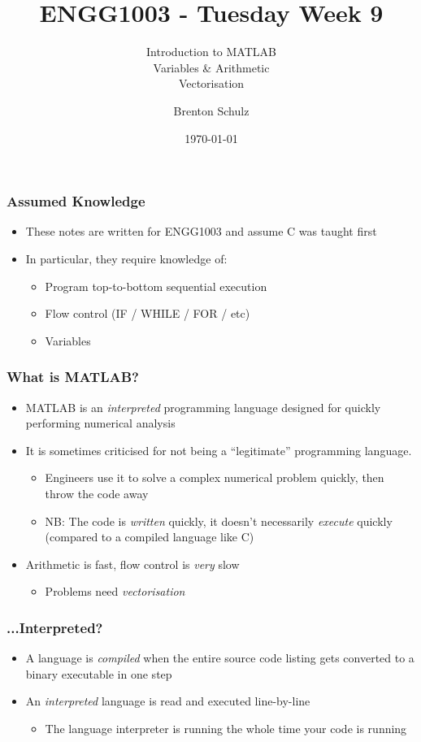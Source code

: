 \documentclass[14pt]{beamer}
\title{ENGG1003 - Tuesday Week 9}
\subtitle{Introduction to MATLAB\\Variables \& Arithmetic\\Vectorisation}
\author{Brenton Schulz}
\institute{University of Newcastle}
\date{\today}
\begin{document}
\titlepage

\begin{frame}
\frametitle{Assumed Knowledge}
\begin{itemize}
\item These notes are written for ENGG1003 and assume C was taught first
\item In particular, they require knowledge of:
	\begin{itemize}
		\item Program top-to-bottom sequential execution
		\item Flow control (IF / WHILE / FOR / etc)
		\item Variables
	\end{itemize}
\end{itemize}
\end{frame}

\begin{frame}
\frametitle{What is MATLAB?}
\begin{itemize}
\item MATLAB is an \textit{interpreted} programming language designed for quickly performing numerical analysis
\item It is sometimes criticised for not being a ``legitimate'' programming language.
	\begin{itemize}
		\item Engineers use it to solve a complex numerical problem quickly, then throw the code away
		\item NB: The code is \textit{written} quickly, it doesn't necessarily \textit{execute} quickly (compared to a compiled language like C)
	\end{itemize}
\item Arithmetic is fast, flow control is \textit{very} slow
\begin{itemize}
	\item Problems need \textit{vectorisation}
\end{itemize}
\end{itemize}
\end{frame}

\begin{frame}
\frametitle{...Interpreted?}
\begin{itemize}
\item A language is \textit{compiled} when the entire source code listing gets converted to a binary executable in one step
\item An \textit{interpreted} language is read and executed line-by-line
	\begin{itemize}
		\item The language interpreter is running the whole time your code is running
	\end{itemize}
\pause

\end{itemize}
\end{frame}
\end{document}

